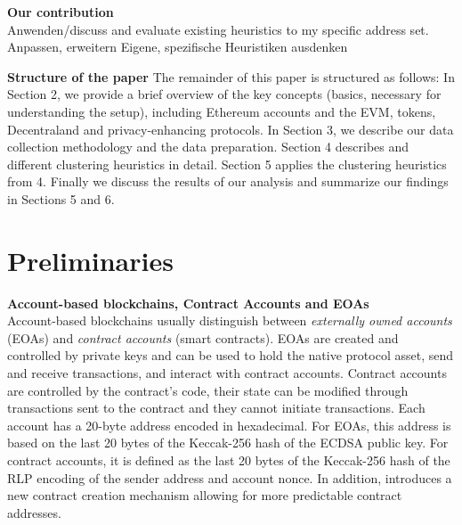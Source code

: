 \documentclass[12pt,a4paper,titlepage,oneside,english]{article}
\begin{document}

\textbf{Our contribution}\\
Anwenden/discuss and evaluate existing heuristics to my specific address set.
Anpassen, erweitern
Eigene, spezifische Heuristiken ausdenken

\textbf{Structure of the paper}
The remainder of this paper is structured as follows: In Section 2, we provide a brief overview of the key concepts (basics, necessary for understanding the setup), including Ethereum accounts and the EVM, tokens, Decentraland and privacy-enhancing protocols. In Section 3, we describe our data collection methodology and the data preparation. Section 4  describes and different clustering heuristics in detail. Section 5 applies the clustering heuristics from 4. Finally we discuss the results of our analysis and summarize our findings in Sections 5 and 6.





\section{Preliminaries}

\textbf{Account-based blockchains, Contract Accounts and EOAs}\\
Account-based blockchains usually distinguish between \textit{externally owned accounts} (EOAs) and \textit{contract accounts} (smart contracts). EOAs are created and controlled by private keys and can be used to hold the native protocol asset, send and receive transactions, and interact with contract accounts. Contract accounts are controlled by the contract's code, their state can be modified through transactions sent to the contract and they cannot initiate transactions. \citep{buterin2014ethereum} \newline Each account has a 20-byte address encoded in hexadecimal. For EOAs, this address is based on the last 20 bytes of the Keccak-256 hash of the ECDSA public key. For contract accounts, it is defined as the last 20 bytes of the Keccak-256 hash of the RLP encoding of the sender address and account nonce. \citep{GW:14} \newline
In addition, \cite{eip1014} introduces a new contract creation mechanism allowing for more predictable contract addresses.%
\end{document}

